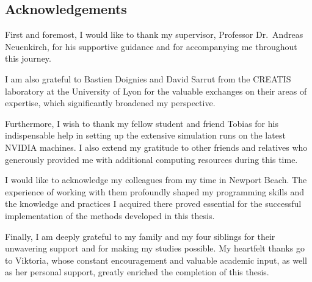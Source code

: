 \documentclass[
11pt, %
english, %
singlespacing, %
headsepline, %
]{MastersThesis} %
\theoremstyle{definition}
\theoremstyle{definition}
\theoremstyle{definition}
\theoremstyle{definition}
\theoremstyle{remark}
\theoremstyle{remark}
\begin{document}
\begin{acknowledgements}
\addchaptertocentry{\acknowledgementname}

\section*{Acknowledgements}

First and foremost, I would like to thank my supervisor, Professor Dr.\ Andreas
Neuenkirch, for his supportive guidance and for accompanying me throughout this
journey.  

I am also grateful to Bastien Doignies and David Sarrut from the CREATIS
laboratory at the University of Lyon for the valuable exchanges on their areas
of expertise, which significantly broadened my perspective.  

Furthermore, I wish to thank my fellow student and friend Tobias for his
indispensable help in setting up the extensive simulation runs on the latest
NVIDIA machines. I also extend my gratitude to other friends and relatives who
generously provided me with additional computing resources during this time.  

I would like to acknowledge my colleagues from my time in Newport Beach. The
experience of working with them profoundly shaped my programming skills and the
knowledge and practices I acquired there proved essential for the successful
implementation of the methods developed in this thesis.  

Finally, I am deeply grateful to my family and my four siblings for their
unwavering support and for making my studies possible. My heartfelt thanks go to
Viktoria, whose constant encouragement and valuable academic input, as well as
her personal support, greatly enriched the completion of this thesis.


\end{acknowledgements}


\tableofcontents %



\end{document}
